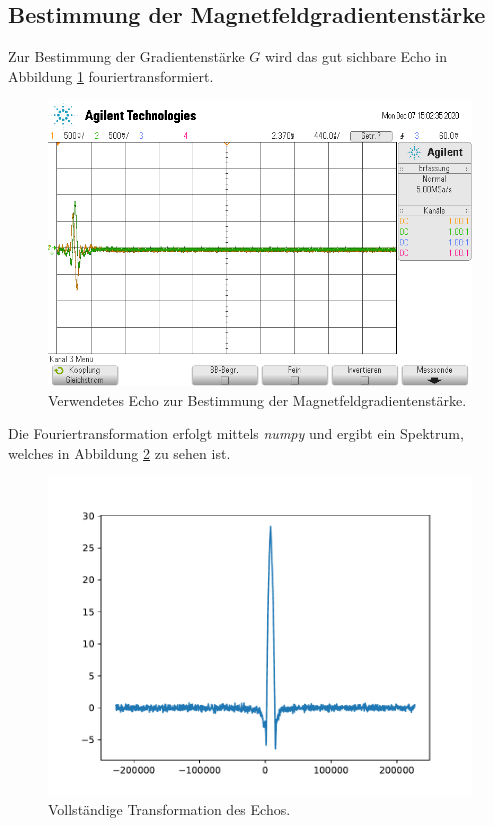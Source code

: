 \subsection{Bestimmung der Magnetfeldgradientenstärke}

Zur Bestimmung der Gradientenstärke $G$ wird das gut sichbare Echo in Abbildung \ref{fig:mfg} fouriertransformiert.

\begin{figure}
  \centering
  \includegraphics[scale=0.4]{content/scope_8.png}
  \caption{Verwendetes Echo zur Bestimmung der Magnetfeldgradientenstärke.}
  \label{fig:mfg}
\end{figure}

Die Fouriertransformation erfolgt mittels \textit{numpy}\cite{numpy} und ergibt ein Spektrum, welches in Abbildung \ref{fig:trafoecho} zu sehen ist. 

\begin{figure}
  \centering
  \includegraphics[scale=0.7]{content/echo_gradient.pdf}
  \caption{Vollständige Transformation des Echos.}
  \label{fig:trafoecho}
\end{figure}

